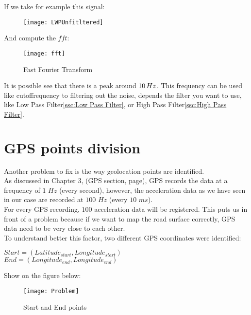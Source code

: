 \documentclass[tesi]{subfiles}
\begin{document}
If we take for example this signal:

\begin{figure}[H]
\texttt{[image: LWPUnfitltered]}
\end{figure}


\noindent And compute the $fft$:
\begin{figure}[H]
\centering
\texttt{[image: fft]}
\caption{Fast Fourier Transform}
\end{figure}\label{fig: Fast Fourier Transform}

\noindent It is possible see that there is a peak around $10 \thinspace Hz$. This frequency can be used like cutoffrequency to filtering out the noise, depends the filter you want to use, like Low Pass Filter\ref{ssc:Low Pass Filter}, or High Pass Filter\ref{ssc:High Pass Filter}.



\section{GPS points division} \label{sc:GPS points division}
Another problem to fix is the way geolocation points are identified.\\
As discussed in Chapter 3, (GPS section, page), GPS records the data at a frequency of $1$ $Hz$ (every second), however, the acceleration data as we have seen in our case are recorded at $100$ $Hz$ (every $10$ $ms$).\\
For every GPS recording, $100$ acceleration data will be registered. This puts us in front of a problem because if we want to map the road surface correctly, GPS data need to be very close to each other.\\
To understand better this factor, two different GPS coordinates were identified:

\begin{center}
 $Start = (Latitude_{start}, Longitude_{start})$\\
 $End = (Longitude_{end}, Longitude_{end})$
\end{center}

\noindent Show on the figure below:
\vspace{0.15cm}
\begin{figure}[H]	

\centering
\texttt{[image: Problem]} \label{GPS Points Problem}
 \caption{Start and End points}
  \label{fig:GPS Points Problem}
\end{figure}
\end{document}
